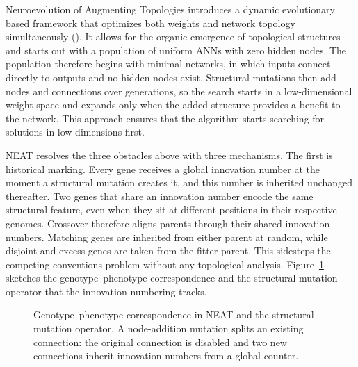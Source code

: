 \documentclass[12pt]{article}
\begin{document}

Neuroevolution of Augmenting Topologies introduces a dynamic evolutionary based framework that optimizes both weights and network topology simultaneously (\cite{stanley_evolving_2002}).
It allows for the organic emergence of topological structures and starts out with a population of uniform ANNs with zero hidden nodes.
The population therefore begins with minimal networks, in which inputs connect directly to outputs and no hidden nodes exist.
Structural mutations then add nodes and connections over generations, so the search starts in a low-dimensional weight space and expands only when the added structure provides a benefit to the network.
This approach ensures that the algorithm starts searching for solutions in low dimensions first.

NEAT resolves the three obstacles above with three mechanisms.
The first is historical marking.
Every gene receives a global innovation number at the moment a structural mutation creates it, and this number is inherited unchanged thereafter.
Two genes that share an innovation number encode the same structural feature, even when they sit at different positions in their respective genomes.
Crossover therefore aligns parents through their shared innovation numbers.
Matching genes are inherited from either parent at random, while disjoint and excess genes are taken from the fitter parent.
This sidesteps the competing-conventions problem without any topological analysis.
Figure~\ref{fig:genotype-phenotype} sketches the genotype--phenotype correspondence and the structural mutation operator that the innovation numbering tracks.

\begin{figure}[h]
\centering
{}
\caption{Genotype--phenotype correspondence in NEAT and the structural mutation operator. A node-addition mutation splits an existing connection: the original connection is disabled and two new connections inherit innovation numbers from a global counter.}
\label{fig:genotype-phenotype}
\end{figure}
\end{document}
